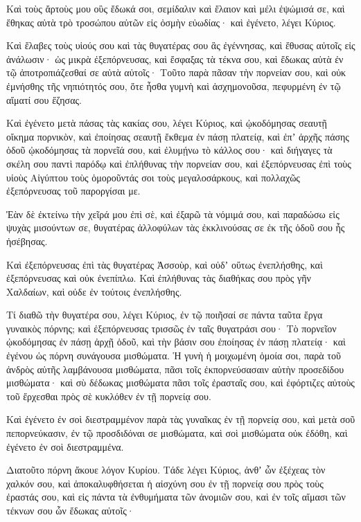 {Καὶ τοὺς ἄρτοὺς μου οὓς ἔδωκά σοι, σεμίδαλιν καὶ ἔλαιον καὶ μέλι ἐψώμισά σε, καὶ ἔθηκας αὐτὰ τρὸ τροσώπου αὐτῶν εἰς ὀσμὴν εὐωδίας· καὶ ἐγένετο, λέγει Κύριος.
\par }{\PP {}Καὶ ἔλαβες τοὺς υἱούς σου καὶ τὰς θυγατέρας σου ἃς ἐγέννησας, καὶ ἔθυσας αὐτοῖς εἰς ἀνάλωσιν· ὡς μικρὰ ἐξεπόρνευσας,
καὶ ἔσφαξας τὰ τέκνα σου, καὶ ἔδωκας αὐτὰ ἐν τῷ ἀποτροπιάζεσθαί σε αὐτὰ αὐτοῖς·
Τοῦτο παρὰ πᾶσαν τὴν πορνείαν σου, καὶ οὐκ ἐμνήσθης τῆς νηπιότητός σου, ὅτε ἦσθα γυμνὴ καὶ ἀσχημονοῦσα, πεφυρμένη ἐν τῷ αἵματί σου ἔζησας.
\par }{\PP {}Καὶ ἐγένετο μετὰ πάσας τὰς κακίας σου, λέγει Κύριος,
καὶ ᾠκοδόμησας σεαυτῇ οἴκημα πορνικὸν, καὶ ἐποίησας σεαυτῇ ἔκθεμα ἐν πάσῃ πλατείᾳ,
καὶ ἐπʼ ἀρχῆς πάσης ὁδοῦ ᾠκοδόμησας τὰ πορνεῖά σου, καὶ ἐλυμῄνω τὸ κάλλος σου· καὶ διήγαγες τὰ σκέλη σου παντὶ παρόδῳ καὶ ἐπλήθυνας τὴν πορνείαν σου,
καὶ ἐξεπόρνευσας ἐπὶ τοὺς υἱοὺς Αἰγύπτου τοὺς ὁμοροῦντάς σοι τοὺς μεγαλοσάρκους, καὶ πολλαχῶς ἐξεπόρνευσας τοῦ παροργίσαι με.
\par }{\PP {}Ἐὰν δὲ ἐκτείνω τὴν χεῖρά μου ἐπὶ σὲ, καὶ ἐξαρῶ τὰ νόμιμά σου, καὶ παραδώσω εἰς ψυχὰς μισούντων σε, θυγατέρας ἀλλοφύλων τὰς ἐκκλινούσας σε ἐκ τῆς ὁδοῦ σου ἧς ἠσέβησας.
\par }{\PP {}Καὶ ἐξεπόρνευσας ἐπὶ τὰς θυγατέρας Ἀσσοὺρ, καὶ οὐδʼ οὕτως ἐνεπλήσθης, καὶ ἐξεπόρνευσας καὶ οὐκ ἐνεπίπλω.
Καὶ ἐπλήθυνας τὰς διαθήκας σου πρὸς γῆν Χαλδαίων, καὶ οὐδε ἐν τούτοις ἐνεπλήσθης.
\par }{\PP {}Τί διαθῶ τὴν θυγατέρα σου, λέγει Κύριος, ἐν τῷ ποιῆσαί σε πάντα ταῦτα ἔργα γυναικὸς πόρνης; καὶ ἐξεπόρνευσας τρισσῶς ἐν ταῖς θυγατράσι σου·
Τὸ πορνεῖον ᾠκοδόμησας ἐν πάσῃ ἀρχῇ ὁδοῦ, καὶ τὴν βάσιν σου ἐποίησας ἐν πάσῃ πλατείᾳ· καὶ ἐγένου ὡς πόρνη συνάγουσα μισθώματα.
Ἡ γυνὴ ἡ μοιχωμένη ὁμοία σοι, παρὰ τοῦ ἀνδρὸς αὐτῆς λαμβάνουσα μισθώματα, πᾶσι τοῖς ἐκπορνεύσασαιν αὐτὴν προσεδίδου μισθώματα·
καὶ σὺ δέδωκας μισθώματα πᾶσι τοῖς ἐρασταῖς σου, καὶ ἐφόρτιζες αὐτοὺς τοῦ ἔρχεσθαι πρὸς σὲ κυκλόθεν ἐν τῇ πορνείᾳ σου.
\par }{\PP {}Καὶ ἐγένετο ἐν σοὶ διεστραμμένον παρὰ τὰς γυναῖκας ἐν τῇ πορνείᾳ σου, καὶ μετὰ σοῦ πεπορνεύκασιν, ἐν τῷ προσδιδόναι σε μισθώματα, καὶ σοὶ μισθώματα οὐκ ἐδόθη, καὶ ἐγένετο ἐν σοὶ διεστραμμένα.
\par }{\PP {}Διατοῦτο πόρνη ἄκουε λόγον Κυρίου.
Τάδε λέγει Κύριος, ἀνθʼ ὧν ἐξέχεας τὸν χαλκόν σου, καὶ ἀποκαλυφθήσεται ἡ αἰσχύνη σου ἐν τῇ πορνείᾳ σου πρὸς τοὺς ἐραστάς σου, καὶ εἰς πάντα τὰ ἐνθυμήματα τῶν ἀνομιῶν σου, καὶ ἐν τοῖς αἵμασι τῶν τέκνων σου ὧν ἔδωκας αὐτοῖς·
}
